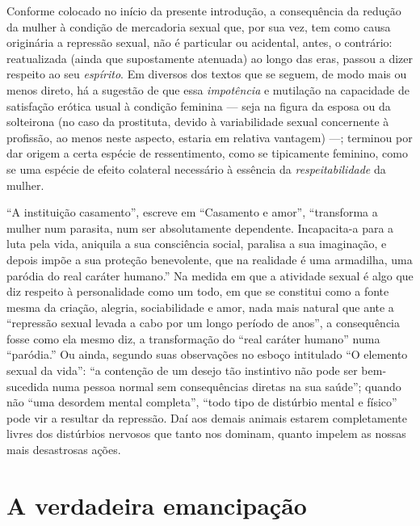 Conforme colocado no início da presente introdução, a consequência da
redução da mulher à condição de mercadoria sexual que, por sua vez, tem
como causa originária a repressão sexual, não é particular ou acidental,
antes, o contrário: reatualizada (ainda que supostamente atenuada) ao
longo das eras, passou a dizer respeito ao seu \textit{espírito}. Em diversos
dos textos que se seguem, de modo mais ou menos direto, há a sugestão de
que essa \textit{impotência} e mutilação na capacidade de satisfação erótica
usual à condição feminina --- seja na figura da esposa ou da solteirona
(no caso da prostituta, devido à variabilidade sexual concernente à
profissão, ao menos neste aspecto, estaria em relativa vantagem) ---;
terminou por dar origem a certa espécie de ressentimento, como se
tipicamente feminino, como se uma espécie de efeito colateral necessário
à essência da \textit{respeitabilidade} da mulher. 

``A instituição
casamento'', escreve em ``Casamento e amor'', ``transforma a mulher num
parasita, num ser absolutamente dependente. Incapacita-a para a luta
pela vida, aniquila a sua consciência social, paralisa a sua imaginação,
e depois impõe a sua proteção benevolente, que na realidade é uma
armadilha, uma paródia do real caráter humano.'' Na medida em que a
atividade sexual é algo que diz respeito à personalidade como um todo,
em que se constitui como a fonte mesma da criação, alegria,
sociabilidade e amor, nada mais natural que ante a ``repressão sexual
levada a cabo por um longo período de anos'', a consequência fosse como
ela mesmo diz, a transformação do ``real caráter humano'' numa
``paródia.'' Ou ainda, segundo suas observações no esboço intitulado ``O
elemento sexual da vida'': ``a contenção de um desejo tão instintivo não
pode ser bem-sucedida numa pessoa normal sem consequências diretas na
sua saúde''; quando não ``uma desordem mental completa'', ``todo tipo de
distúrbio mental e físico'' pode vir a resultar da repressão. Daí aos
demais animais estarem completamente livres dos distúrbios nervosos que
tanto nos dominam, quanto impelem as nossas mais desastrosas ações.

\section{A verdadeira emancipação}

